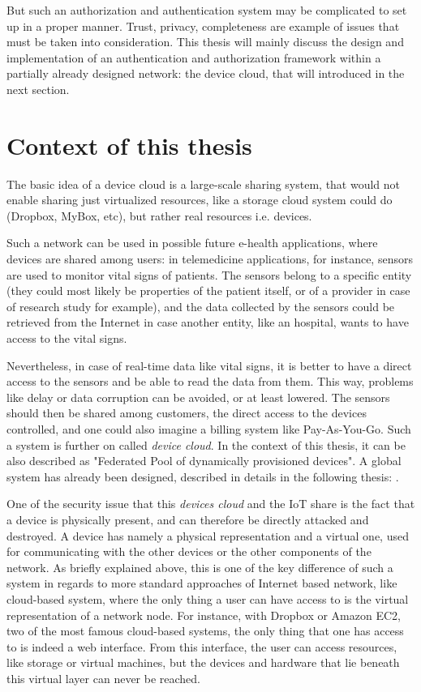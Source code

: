 But such an authorization and authentication system may be complicated to set up in a proper manner. Trust, privacy, completeness are example of issues that must be taken into consideration. This thesis will mainly discuss the design and implementation of an authentication and authorization framework within a partially already designed network: the device cloud, that will introduced in the next section. 

\section{Context of this thesis}

The basic idea of a device cloud is a large-scale sharing system, that would not enable sharing just virtualized resources, like a storage cloud system could do (Dropbox, MyBox, etc), but rather real resources i.e. devices.

Such a network can be used in possible future e-health applications, where devices are shared among users: in telemedicine applications, for instance, sensors are used to monitor vital signs of patients. The sensors belong to a specific entity (they could most likely be properties of the patient itself, or of a provider in case of research study for example), and the data collected by the sensors could be retrieved from the Internet in case another entity, like an hospital, wants to have access to the vital signs. 

Nevertheless, in case of real-time data like vital signs, it is better to have a direct access to the sensors and be able to read the data from them. This way, problems like delay or data corruption can be avoided, or at least lowered. The sensors should then be shared among customers, the direct access to the devices controlled, and one could also imagine a billing system like Pay-As-You-Go. Such a system is further on called \emph{device cloud}. In the context of this thesis, it can be also described as "Federated Pool of dynamically provisioned devices". A global system has already been designed, described in details in the following thesis:  \cite{reference_thesis}.

One of the security issue that this \emph{devices cloud} and the IoT share is the fact that a device is physically present, and can therefore be directly attacked and destroyed. A device has namely a physical representation and a virtual one, used for communicating with the other devices or the other components of the network. As briefly explained above, this is one of the key difference of such a system in regards to more standard approaches of Internet based network, like cloud-based system, where the only thing a user can have access to is the virtual representation of a network node. For instance, with Dropbox or Amazon EC2, two of the most famous cloud-based systems, the only thing that one has access to is indeed a web interface. From this interface, the user can access resources, like storage or virtual machines, but the devices and hardware that lie beneath this virtual layer can never be reached.

